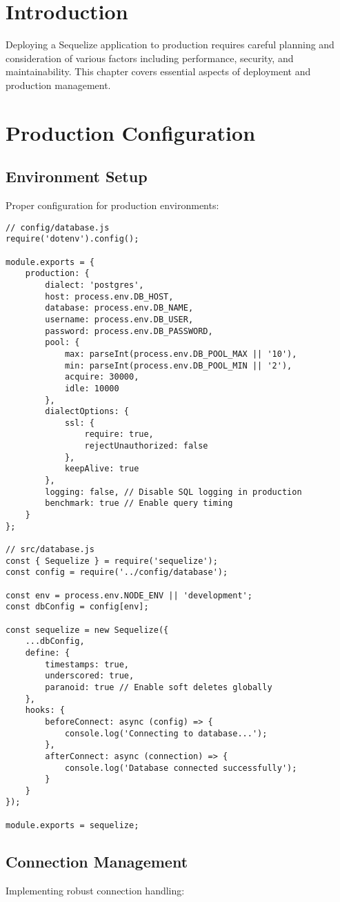 \documentclass[12pt,a4paper]{book}
\begin{document}
	\section{Introduction}
	Deploying a Sequelize application to production requires careful planning and consideration of various factors including performance, security, and maintainability. This chapter covers essential aspects of deployment and production management.
	
	\section{Production Configuration}
	
	\subsection{Environment Setup}
	Proper configuration for production environments:
	
	\begin{verbatim}
// config/database.js
require('dotenv').config();

module.exports = {
	production: {
		dialect: 'postgres',
		host: process.env.DB_HOST,
		database: process.env.DB_NAME,
		username: process.env.DB_USER,
		password: process.env.DB_PASSWORD,
		pool: {
			max: parseInt(process.env.DB_POOL_MAX || '10'),
			min: parseInt(process.env.DB_POOL_MIN || '2'),
			acquire: 30000,
			idle: 10000
		},
		dialectOptions: {
			ssl: {
				require: true,
				rejectUnauthorized: false
			},
			keepAlive: true
		},
		logging: false, // Disable SQL logging in production
		benchmark: true // Enable query timing
	}
};

// src/database.js
const { Sequelize } = require('sequelize');
const config = require('../config/database');

const env = process.env.NODE_ENV || 'development';
const dbConfig = config[env];

const sequelize = new Sequelize({
	...dbConfig,
	define: {
		timestamps: true,
		underscored: true,
		paranoid: true // Enable soft deletes globally
	},
	hooks: {
		beforeConnect: async (config) => {
			console.log('Connecting to database...');
		},
		afterConnect: async (connection) => {
			console.log('Database connected successfully');
		}
	}
});

module.exports = sequelize;
	\end{verbatim}
	
	\subsection{Connection Management}
	Implementing robust connection handling:
	
\end{document}

